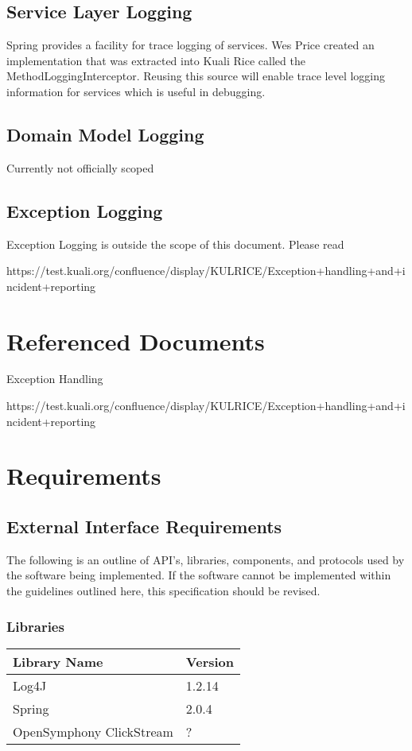 \documentclass[12pt]{report}
\begin{document}
\subsection{Service Layer Logging}
Spring provides a facility for trace logging of services. Wes Price created an implementation that was extracted into
Kuali Rice called the MethodLoggingInterceptor. Reusing this source will enable trace level logging information for 
services which is useful in debugging.

\subsection{Domain Model Logging}
Currently not officially scoped

\subsection{Exception Logging}
Exception Logging is outside the scope of this document. Please read 

https://test.kuali.org/confluence/display/KULRICE/Exception+handling+and+incident+reporting

\section{Referenced Documents}
Exception Handling
 
https://test.kuali.org/confluence/display/KULRICE/Exception+handling+and+incident+reporting

\section{Requirements}
\subsection{External Interface Requirements}
The following is an outline of API's, libraries, components, and protocols used by the software being implemented. If the software
cannot be implemented within the guidelines outlined here, this specification should be revised.

\subsubsection{Libraries}
\begin{tabular}{l|l}
  Library Name & Version \\
  \hline
  Log4J & 1.2.14 \\ 
  Spring & 2.0.4 \\ 
  OpenSymphony ClickStream & ?
\end{tabular}
\end{document}

